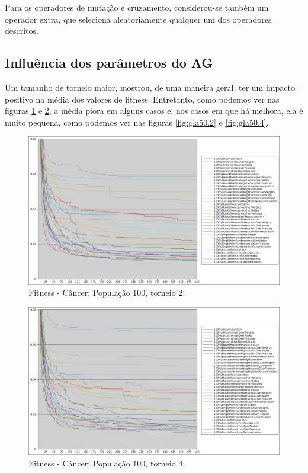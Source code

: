 \documentclass[12pt]{article}
\begin{document}
Para os operadores de mutação e cruzamento, considerou-se também um operador extra, que seleciona aleatoriamente qualquer um dos operadores descritos.

\subsection{Influência dos parâmetros do AG}\label{res:ag}

Um tamanho de torneio maior, mostrou, de uma maneira geral, ter um impacto positivo na média dos valores de fitness. Entretanto, como podemos ver nas figuras \ref{fig:can100.2} e \ref{fig:can100.4}, a média piora em alguns casos e, nos casos em que há melhora, ela é muito pequena, como podemos ver nas figuras \ref{fig:gla50.2} e \ref{fig:gla50.4}.

\begin{figure}[htp]
\center
\includegraphics[scale=0.4, keepaspectratio]{cancer_100_2.jpg} 
\caption{Fitness - Câncer; População 100, torneio 2;}
\label{fig:can100.2}
\end{figure}

\begin{figure}[hbp]
\center
\includegraphics[scale=0.4, keepaspectratio]{cancer_100_4_converted.jpg} 
\caption{Fitness - Câncer; População 100, torneio 4;}
\label{fig:can100.4}
\end{figure}
\end{document}
